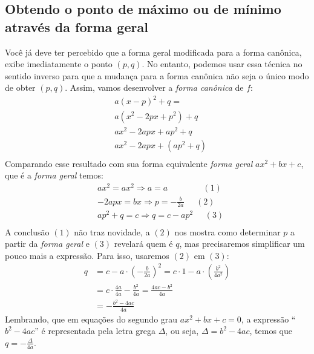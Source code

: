 \subsection{Obtendo o ponto de máximo ou de mínimo através da forma geral}

Você já deve ter percebido que a forma geral modificada para a forma canônica, exibe imediatamente o ponto \((p,q)\). No entanto, podemos usar essa técnica no sentido inverso para que a mudança para a forma canônica não seja o único modo de obter \((p,q)\). Assim, vamos desenvolver a \textit{forma canônica} de \(f\):
\begin{equation*}
\begin{split}& a(x-p)^2+q= \\
& a(x^2-2px+p^2)+q \\
& ax^2-2apx+ap^2+q \\
& ax^2-2apx+(ap^2+q) \\\end{split}
\end{equation*}
Comparando esse resultado com sua forma equivalente \textit{forma geral} \(ax^2+bx+c\), que é a \textit{forma geral} temos:
\begin{equation*}
\begin{split}& ax^2=ax^2 \Rightarrow a=a \;\;\;\;\;\;\;\;\;\;\;\;\;\;\; (1) \\
& -2apx=bx \Rightarrow p=-\frac{b}{2a} \;\;\;\;\; (2)\\
& ap^2+q=c \Rightarrow q=c-ap^2 \;\;\;\;\; (3)\\\end{split}
\end{equation*}
A conclusão \((1)\) não traz novidade, a \((2)\) nos mostra como determinar \(p\) a partir da \textit{forma geral} e \((3)\) revelará quem é \(q\), mas precisaremos simplificar um pouco mais a expressão. Para isso, usaremos \((2)\) em \((3)\):
\begin{equation*}
\begin{split}q &=c-a \cdot \left(- \frac{b}{2a} \right)^{2} =c \cdot 1-a \cdot \left( \frac{b^2}{4a^2} \right) \\
& =c \cdot \frac{4a}{4a} - \frac{b^2}{4a}= \frac{4ac-b^2}{4a} \\
& = - \frac{b^2-4ac}{4a}\end{split}
\end{equation*}
Lembrando, que em equações do segundo grau \(ax^2+bx+c=0\), a expressão “\(b^2-4ac\)” é representada pela letra grega \(\Delta\), ou seja, \(\Delta = b^2-4ac\), temos que \(q = - \displaystyle\frac{\Delta}{4a}\).

